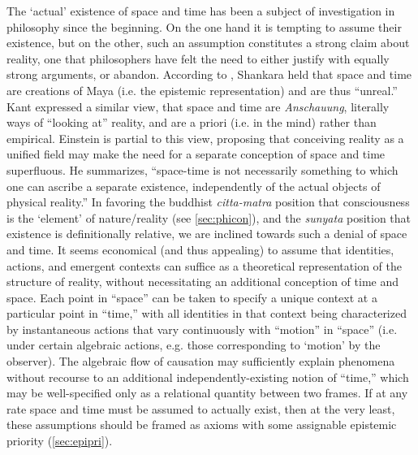 \documentclass[pra,twocolumn,groupedaddress,10pt]{revtex4}
\theoremstyle{definition}
\begin{document}
The `actual' existence of space and time has been a subject of investigation in philosophy since the beginning. On the one hand it is tempting to assume their existence, but on the other, such an assumption constitutes a strong claim about reality, one that philosophers have felt the need to either justify with equally strong arguments, or abandon. According to \cite{waite}, Shankara held that space and time are creations of Maya (i.e. the epistemic representation) and are thus ``unreal.'' Kant expressed a similar view, that space and time are \emph{Anschauung}, literally ways of ``looking at'' reality\cite{russell}, and are a priori (i.e. in the mind) rather than empirical. Einstein is partial to this view, proposing that conceiving reality as a unified field may make the need for a separate conception of space and time superfluous. He summarizes, ``space-time is not necessarily something to which one can ascribe a separate existence, independently of the actual objects of physical reality.''\cite{einstein} In favoring the buddhist \emph{citta-matra} position that consciousness is the `element' of nature/reality (see \autoref{sec:phicon}), and the \emph{sunyata} position that existence is definitionally relative, we are inclined towards such a denial of space and time. It seems economical (and thus appealing) to assume that identities, actions, and emergent contexts can suffice as a theoretical representation of the structure of reality, without necessitating an additional conception of time and space. Each point in ``space'' can be taken to specify a unique context at a particular point in ``time,'' with all identities in that context being characterized by instantaneous actions that vary continuously with ``motion'' in ``space'' (i.e. under certain algebraic actions, e.g. those corresponding to `motion' by the observer). The algebraic flow of causation may sufficiently explain phenomena without recourse to an additional independently-existing notion of ``time,'' which may be well-specified only as a relational quantity between two frames. If at any rate space and time must be assumed to actually exist, then at the very least, these assumptions should be framed as axioms with some assignable epistemic priority (\autoref{sec:epipri}).
\end{document}
